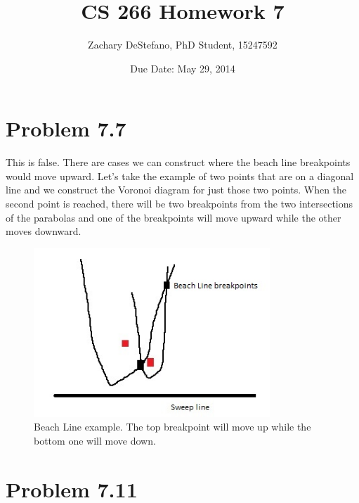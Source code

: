\documentclass[11pt,psfig]{article}
\begin{document}
\setlength{\parskip}{1.2ex plus0.3ex minus 0.3ex}


\thispagestyle{empty} \pagestyle{myheadings} 



\title{CS 266 Homework 7}
\author{Zachary DeStefano, PhD Student, 15247592}
\date{Due Date: May 29, 2014}

\maketitle

\vfill\eject

\section*{Problem 7.7}
This is false. There are cases we can construct where the beach line breakpoints would move upward. Let's take the example of two points that are on a diagonal line and we construct the Voronoi diagram for just those two points. When the second point is reached, there will be two breakpoints from the two intersections of the parabolas and one of the breakpoints will move upward while the other moves downward.

\begin{figure}[H]
\centering
\includegraphics[height=2.5in]{hw7prob1diagram.jpg}
\caption{Beach Line example. The top breakpoint will move up while the bottom one will move down.}
\end{figure}

\section*{Problem 7.11}
\end{document}

